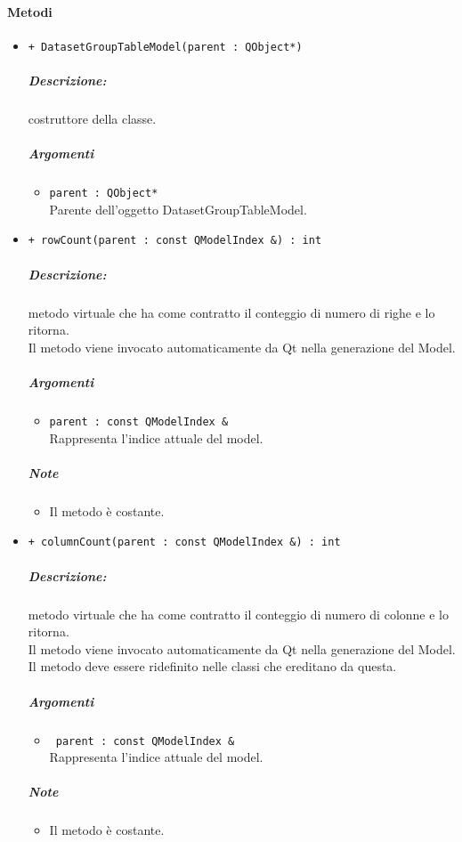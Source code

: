 \paragraph{\color{black}Metodi\\}
\begin{itemize}
	\item \color{blue}\verb!+ DatasetGroupTableModel(parent : QObject*)!\\
		\color{black}
		\subparagraph{Descrizione:} costruttore della classe.\\
		\subparagraph{Argomenti}
			\begin{itemize}
				\item \color{RoyalPurple}\verb!parent : QObject*!\\
				\color{Black}Parente dell'oggetto DatasetGroupTableModel.
			\end{itemize}
			
	\item \color{blue}\verb!+ rowCount(parent : const QModelIndex &) : int!\\
	\color{black}
	\subparagraph{Descrizione:} metodo virtuale che ha come contratto il conteggio di numero di righe e lo ritorna.
	\\Il metodo viene invocato automaticamente da Qt\g{} nella generazione del Model.\\
	\subparagraph{Argomenti}
		\begin{itemize}
			\item \color{RoyalPurple}\verb!parent : const QModelIndex &!\\
			\color{Black}Rappresenta l'indice attuale del model.
		\end{itemize}
	\subparagraph{Note}
			\begin{itemize}
				\item Il metodo è costante.
			\end{itemize}
	
	\item \color{blue}\verb!+ columnCount(parent : const QModelIndex &) : int!\\
	\color{black}
	\subparagraph{Descrizione:} metodo virtuale che ha come contratto il conteggio di numero di colonne e lo ritorna.\\
	Il metodo viene invocato automaticamente da Qt\g{} nella generazione del Model.\\
	Il metodo deve essere ridefinito nelle classi che ereditano da questa.\\
	\subparagraph{Argomenti}
		\begin{itemize}
			\item \color{RoyalPurple}\verb! parent : const QModelIndex &!\\
			\color{black}Rappresenta l'indice attuale del model.
		\end{itemize}
	\subparagraph{Note}
			\begin{itemize}
				\item Il metodo è costante.
			\end{itemize}
		

\end{itemize}
